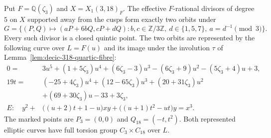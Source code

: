 



\begin{proposition}\label{prop:decic318-classification}
Put $F=\mathbb Q(\zeta_3)$ and $X=X_1(3,18)_F$.
The effective $F$-rational divisors of degree $5$ on $X$
supported away from the cusps form exactly two orbits under
\[
 G=\{(P,Q)\mapsto(aP+6bQ,cP+dQ):
 b,c\in\mathbb Z/3\mathbb Z,\ d\in\{1,5,7\},\ a=d^{-1}\pmod3\}.
\]
Every such divisor is a closed quintic point.
The two orbits are represented by the following curve over
$L=F(u)$ and its image under the involution $\tau$ of
Lemma~\ref{lem:decic-318-quartic-fibre}:
\[
\begin{split}
 0={}&3u^5+(1+5\zeta_3)u^4+(6\zeta_3-3)u^3
           -(6\zeta_3+9)u^2-(5\zeta_3+4)u+3,\\
 19t={}&(-25+4\zeta_3)u^4+(12-65\zeta_3)u^3
         +(20+31\zeta_3)u^2\\
       &+(69+30\zeta_3)u-33+3\zeta_3,\\
 E:\quad y^2+{}&\bigl((u+2)t+1-u\bigr)xy
                  +\bigl((u+1)t^2-ut\bigr)y=x^3.
\end{split}
\]
The marked points are $P_3=(0,0)$ and $Q_{18}=(-t,t^2)$.
Both represented elliptic curves have full torsion group
$C_3\times C_{18}$ over $L$.
\end{proposition}
